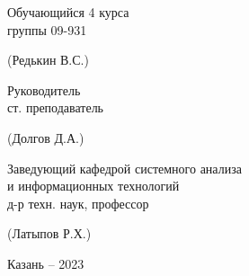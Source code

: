 \begin{titlepage}
	\begin{center}
		
		\begin{minipage}{\textwidth}
			\begin{minipage}{0.40\textwidth}
				\begin{singlespace}
					Обучающийся 4 курса \\
					группы 09-931
				\end{singlespace}
			\end{minipage}
			\begin{minipage}{0.60\textwidth}
				\hfill (Редькин В.С.)
			\end{minipage}
		\end{minipage}
	
		\vspace{0.5cm}

		\begin{minipage}{\textwidth}
			\begin{minipage}{0.40\textwidth}
				\begin{singlespace}
				Руководитель \\
				ст. преподаватель
				\end{singlespace}
			\end{minipage}
			\begin{minipage}{0.60\textwidth}
				\hfill (Долгов Д.А.)
			\end{minipage}
		\end{minipage}
	
		\vspace{0.5cm}
		
		\begin{minipage}{\textwidth}
			\begin{minipage}{0.60\textwidth}
				\raggedright
				\begin{singlespace}
					Заведующий кафедрой системного анализа \\
					и информационных технологий \\
					д-р техн. наук, профессор
				\end{singlespace}
			\end{minipage}
			\begin{minipage}{0.40\textwidth}
				\hfill (Латыпов Р.Х.)
			\end{minipage}
		\end{minipage}
		
		
		
	\end{center}
	
	
	\vfill
	
	\begin{center}
		Казань -- 2023
	\end{center}
	
	
\end{titlepage}